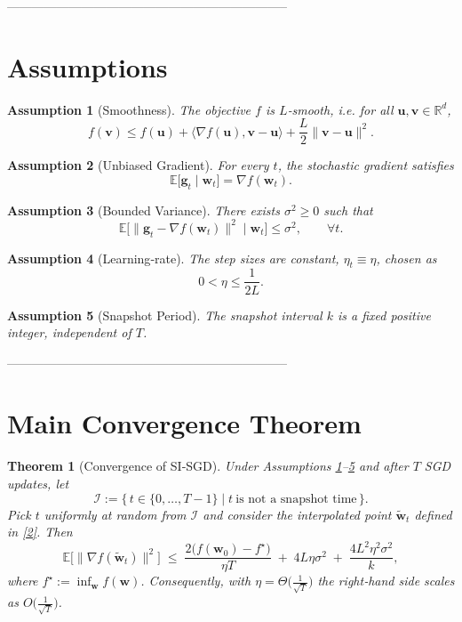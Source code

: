 \documentclass{article}
\newtheorem{theorem}{Theorem}
\newtheorem{assumption}{Assumption}
\begin{document}
--------------------------------------------------------------------

\section*{Assumptions}
\begin{assumption}[Smoothness]\label{as:smooth}
The objective $f$ is $L$‑smooth, i.e. for all $\mathbf{u},\mathbf{v}\in\mathbb{R}^d$,
\[
f(\mathbf{v})\le f(\mathbf{u})+\langle\nabla f(\mathbf{u}),\mathbf{v}-\mathbf{u}\rangle+\frac{L}{2}\|\mathbf{v}-\mathbf{u}\|^2 .
\]
\end{assumption}
\begin{assumption}[Unbiased Gradient]\label{as:unbiased}
For every $t$, the stochastic gradient satisfies
\[
\mathbb{E}\big[\mathbf{g}_t\mid\mathbf{w}_t\big]=\nabla f(\mathbf{w}_t).
\]
\end{assumption}
\begin{assumption}[Bounded Variance]\label{as:variance}
There exists $\sigma^2\ge0$ such that
\[
\mathbb{E}\big[\|\mathbf{g}_t-\nabla f(\mathbf{w}_t)\|^2\mid\mathbf{w}_t\big]\le\sigma^2,\qquad\forall t .
\]
\end{assumption}
\begin{assumption}[Learning‑rate]\label{as:lr}
The step sizes are constant, $\eta_t\equiv\eta$, chosen as
\[
0<\eta\le \frac{1}{2L}.
\]
\end{assumption}
\begin{assumption}[Snapshot Period]\label{as:k}
The snapshot interval $k$ is a fixed positive integer, independent of $T$.
\end{assumption}

--------------------------------------------------------------------

\section*{Main Convergence Theorem}
\begin{theorem}[Convergence of SI‑SGD]\label{thm:main}
Under Assumptions \ref{as:smooth}–\ref{as:k} and after $T$ SGD updates, let
\[
\mathcal{I}:=\{\,t\in\{0,\dots,T-1\}\mid t\ \text{is not a snapshot time}\,\}.
\]
Pick $t$ uniformly at random from $\mathcal{I}$ and consider the interpolated point $\tilde{\mathbf{w}}_t$ defined in \eqref{2}. Then
\[
\mathbb{E}\Big[\big\|\nabla f(\tilde{\mathbf{w}}_t)\big\|^2\Big]
\;\le\;
\frac{2\big(f(\mathbf{w}_0)-f^\star\big)}{\eta T}
\;+\;
4L\eta\sigma^2
\;+\;
\frac{4L^2\eta^2\sigma^2}{k},
\tag{3}
\]
where $f^\star:=\inf_{\mathbf{w}}f(\mathbf{w})$.  
Consequently, with $\eta =\Theta\!\big(\tfrac{1}{\sqrt{T}}\big)$ the right‑hand side scales as $O\!\big(\tfrac{1}{\sqrt{T}}\big)$.
\end{theorem}
\end{document}
